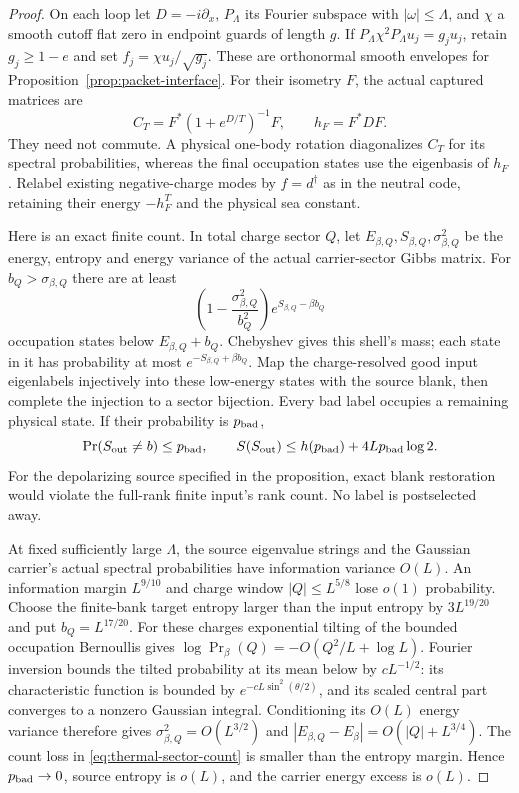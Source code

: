 \begin{proof}
On each loop let $D=-i\partial_x$, $P_\Lambda$ its Fourier subspace
with $|\omega|\le\Lambda$, and $\chi$ a smooth cutoff flat zero in
endpoint guards of length $g$. If
$P_\Lambda\chi^2P_\Lambda u_j=g_j u_j$, retain $g_j\ge1-e$ and
set $f_j=\chi u_j/\sqrt{g_j}$. These are orthonormal smooth
envelopes for Proposition~\ref{prop:packet-interface}.
For their isometry $F$, the actual captured matrices are
\[
 C_T=F^*(1+e^{D/T})^{-1}F,\qquad h_F=F^*DF.
\]
They need not commute. A physical one-body rotation diagonalizes
$C_T$ for its spectral probabilities, whereas the final occupation
states use the eigenbasis of $h_F$. Relabel existing negative-charge
modes by $f=d^\dagger$ as in the neutral code, retaining their
energy $-h_F^T$ and the physical sea constant.

Here is an exact finite count. In total charge sector $Q$, let
$E_{\beta,Q},S_{\beta,Q},\sigma_{\beta,Q}^2$ be the energy,
entropy and energy variance of the actual carrier-sector Gibbs
matrix. For $b_Q>\sigma_{\beta,Q}$ there are at least
\begin{equation}
 \left(1-\frac{\sigma_{\beta,Q}^2}{b_Q^2}\right)
           e^{S_{\beta,Q}-\beta b_Q}
 \label{eq:thermal-sector-count}
\end{equation}
occupation states below $E_{\beta,Q}+b_Q$. Chebyshev gives this
shell's mass; each state in it has probability at most
$e^{-S_{\beta,Q}+\beta b_Q}$. Map the charge-resolved good input
eigenlabels injectively into these low-energy states with the source
blank, then complete the injection to a sector bijection.
Every bad label occupies a remaining physical state. If their
probability is $p_{\rm bad}$,
\[
 \Pr(S_{\rm out}\ne b)\le p_{\rm bad},\qquad
 S(S_{\rm out})\le h(p_{\rm bad})+4L p_{\rm bad}\log2.
\]
For the depolarizing source specified in the proposition, exact blank
restoration would violate the full-rank finite input's rank count.
No label is postselected away.

At fixed sufficiently large $\Lambda$, the source eigenvalue
strings and the Gaussian carrier's actual spectral probabilities
have information variance $O(L)$. An information margin $L^{9/10}$
and charge window $|Q|\le L^{5/8}$ lose $o(1)$ probability.
Choose the finite-bank target entropy larger than the input entropy
by $3L^{19/20}$ and put $b_Q=L^{17/20}$.
For these charges exponential tilting of the bounded occupation
Bernoullis gives $\log\Pr_\beta(Q)=-O(Q^2/L+\log L)$.
Fourier inversion bounds the tilted probability at its mean below
by $cL^{-1/2}$: its characteristic function is bounded by
$e^{-cL\sin^2(\theta/2)}$, and its scaled central part converges
to a nonzero Gaussian integral. Conditioning its $O(L)$ energy
variance therefore gives $\sigma_{\beta,Q}^2=O(L^{3/2})$ and
$|E_{\beta,Q}-E_\beta|=O(|Q|+L^{3/4})$.
The count loss in \eqref{eq:thermal-sector-count} is smaller than
the entropy margin. Hence $p_{\rm bad}\to0$, source entropy is
$o(L)$, and the carrier energy excess is $o(L)$.


\end{proof}
